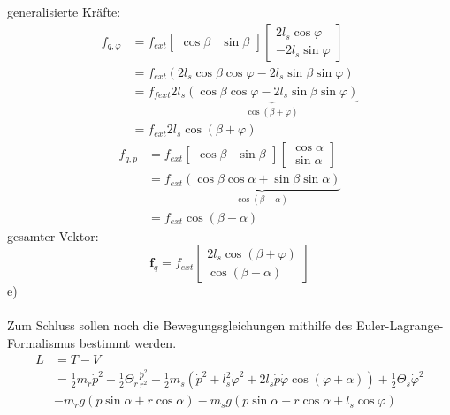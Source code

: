 	generalisierte Kräfte:
	\begin{align*}
		f_{q,\varphi} &= f_{ext}\left[\begin{matrix}
		\cos\beta & \sin\beta
		\end{matrix}\right] \left[\begin{matrix}
		2l_s\cos\varphi \\
		-2l_s\sin\varphi
		\end{matrix}\right] \\
		&= f_{ext} \left(2l_s\cos\beta\cos\varphi - 2l_s\sin\beta\sin\varphi\right) \\
		&= f_{fext}2l_s \underbrace{\left(\cos\beta\cos\varphi - 2l_s\sin\beta\sin\varphi\right)}_{\cos\left(\beta + \varphi\right)} \\
		&= f_{ext}2l_s\cos\left(\beta + \varphi\right)
	\end{align*}
	\begin{align*}
		f_{q,p} &= f_{ext} \left[\begin{matrix}
		\cos\beta & \sin\beta
		\end{matrix}\right] \left[\begin{matrix}
			\cos\alpha \\
			\sin\alpha
		\end{matrix}\right] \\
		&= f_{ext} \underbrace{\left(\cos\beta\cos\alpha + \sin\beta\sin\alpha\right)}_{\cos\left(\beta - \alpha\right)} \\
		&= f_{ext} \cos\left(\beta - \alpha\right)
	\end{align*}
	gesamter Vektor:
	\[
		\textbf{f}_q = f_{ext} \left[\begin{matrix}
			2l_s\cos\left(\beta + \varphi\right) \\
			\cos\left(\beta - \alpha\right)
		\end{matrix}\right]
	\]
	\noindent
	e) \\ \\
	Zum Schluss sollen noch die Bewegungsgleichungen mithilfe des Euler-Lagrange-Formalismus bestimmt werden.
	\begin{align*}
		L &= T - V \\
		 &= \frac{1}{2}m_r\dot{p}^2 + \frac{1}{2} \Theta_r \frac{\dot{p}^2}{r^2} + \frac{1}{2}m_s\left(\dot{p}^2 + l_s^2\dot{\varphi}^2 + 2l_s\dot{p}\dot{\varphi}\cos\left(\varphi + \alpha\right)\right) + \frac{1}{2} \Theta_s \dot{\varphi}^2 \\
		 & - m_rg\left(p\sin\alpha + r\cos\alpha\right) - m_sg\left(p\sin\alpha + r\cos\alpha + l_s\cos\varphi\right)
	\end{align*}
